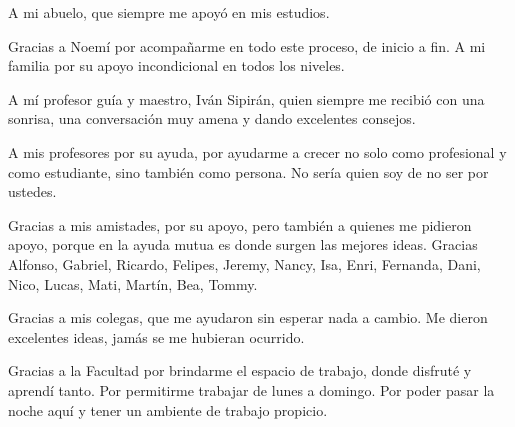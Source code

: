 \documentclass{umemoria}
\begin{document}
\begin{dedicatoria}
A mi abuelo, que siempre me apoyó en mis estudios. 
\end{dedicatoria}

\begin{thanks}
    Gracias a Noemí por acompañarme en todo este proceso, de inicio a fin. A mi familia por su apoyo incondicional en todos los niveles.

    A mí profesor guía y maestro, Iván Sipirán, quien siempre me recibió con una sonrisa, una conversación muy amena y dando excelentes consejos.

    A mis profesores por su ayuda, por ayudarme a crecer no solo como profesional y como estudiante, sino también como persona. No sería quien soy de no ser por ustedes. 

    Gracias a mis amistades, por su apoyo, pero también a quienes me pidieron apoyo, porque en la ayuda mutua es donde surgen las mejores ideas. Gracias Alfonso, Gabriel, Ricardo, Felipes, Jeremy, Nancy, Isa, Enri, Fernanda, Dani, Nico, Lucas, Mati, Martín, Bea, Tommy.

    Gracias a mis colegas, que me ayudaron sin esperar nada a cambio. Me dieron excelentes ideas, jamás se me hubieran ocurrido.

    Gracias a la Facultad por brindarme el espacio de trabajo, donde disfruté y aprendí tanto. Por permitirme trabajar de lunes a domingo. Por poder pasar la noche aquí y tener un ambiente de trabajo propicio.

\end{thanks}

\tableofcontents

\mainmatter










\nocite{*}









\end{document}
